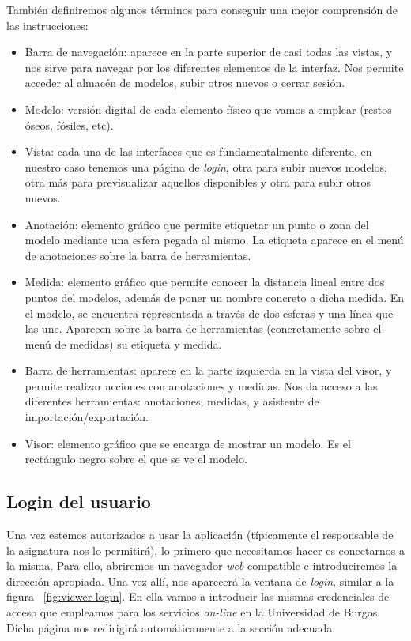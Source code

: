 También definiremos algunos términos para conseguir una mejor comprensión de las instrucciones:
\begin{itemize}
	\item Barra de navegación: aparece en la parte superior de casi todas las vistas, y nos sirve para navegar por los diferentes elementos de la interfaz. Nos permite acceder al almacén de modelos, subir otros nuevos o cerrar sesión.
	\item Modelo: versión digital de cada elemento físico que vamos a emplear (restos óseos, fósiles, etc).
	\item Vista: cada una de las interfaces que es fundamentalmente diferente, en nuestro caso tenemos una página de \textit{login}, otra para subir nuevos modelos, otra más para previsualizar aquellos disponibles y otra para subir otros nuevos.
	\item Anotación: elemento gráfico que permite etiquetar un punto o zona del modelo mediante una esfera pegada al mismo. La etiqueta aparece en el menú de anotaciones sobre la barra de herramientas.
	\item Medida: elemento gráfico que permite conocer la distancia lineal entre dos puntos del modelos, además de poner un nombre concreto a dicha medida. En el modelo, se encuentra representada a través de dos esferas y una línea que las une. Aparecen sobre la barra de herramientas (concretamente sobre el menú de medidas) su etiqueta y medida.
	\item Barra de herramientas: aparece en la parte izquierda en la vista del visor, y permite realizar acciones con anotaciones y medidas. Nos da acceso a las diferentes herramientas: anotaciones, medidas, y asistente de importación\slash exportación.
	\item Visor: elemento gráfico que se encarga de mostrar un modelo. Es el rectángulo negro sobre el que se ve el modelo.
\end{itemize}

\subsection{Login del usuario}
Una vez estemos autorizados a usar la aplicación (típicamente el responsable de la asignatura nos lo permitirá), lo primero que necesitamos hacer es conectarnos a la misma. Para ello, abriremos un navegador \textit{web} compatible e introduciremos la dirección apropiada. Una vez allí, nos aparecerá la ventana de \textit{login}, similar a la figura ~\ref{fig:viewer-login}. En ella vamos a introducir las mismas credenciales de acceso que empleamos para los servicios \textit{on-line} en la Universidad de Burgos. Dicha página nos redirigirá automáticamente a la sección adecuada.


